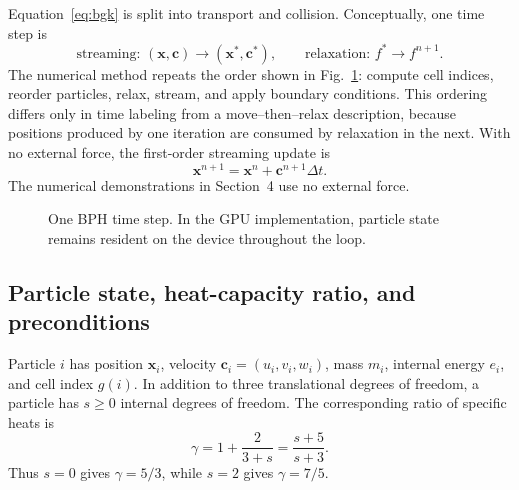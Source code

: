 \documentclass[a4paper,11pt]{article}
\newcommand{\vect}[1]{\bm{#1}}
\begin{document}
Equation~\eqref{eq:bgk} is split into transport and collision.  Conceptually,
one time step is
\begin{equation}
 \text{streaming: }(\vect{x},\vect{c})\longrightarrow
 (\vect{x}^{*},\vect{c}^{*}),
 \qquad
 \text{relaxation: }f^{*}\longrightarrow f^{n+1}.
\end{equation}
The numerical method repeats the order shown in Fig.~\ref{fig:loop}: compute
cell indices, reorder particles, relax, stream, and apply boundary conditions.
This ordering differs only in time labeling from a move--then--relax
description, because positions produced by one iteration are consumed by
relaxation in the next.  With no external force, the first-order streaming
update is
\begin{equation}
 \vect{x}^{n+1}=\vect{x}^{n}+\vect{c}^{n+1}\Delta t.
 \label{eq:stream}
\end{equation}
The numerical demonstrations in Section~4 use no external force.

\begin{figure}[H]
 \centering
 \caption{One BPH time step.  In the GPU implementation, particle state remains
 resident on the device throughout the loop.}
 \label{fig:loop}
\end{figure}

\subsection{Particle state, heat-capacity ratio, and preconditions}

Particle $i$ has position $\vect{x}_i$, velocity
$\vect{c}_i=(u_i,v_i,w_i)$, mass $m_i$, internal energy $e_i$, and cell index
$g(i)$.  In addition to three translational degrees of freedom, a particle has
$s\geq0$ internal degrees of freedom.  The corresponding ratio of specific
heats is
\begin{equation}
 \gamma=1+\frac{2}{3+s}=\frac{s+5}{s+3}.
 \label{eq:gamma}
\end{equation}
Thus $s=0$ gives $\gamma=5/3$, while $s=2$ gives $\gamma=7/5$.
\end{document}
